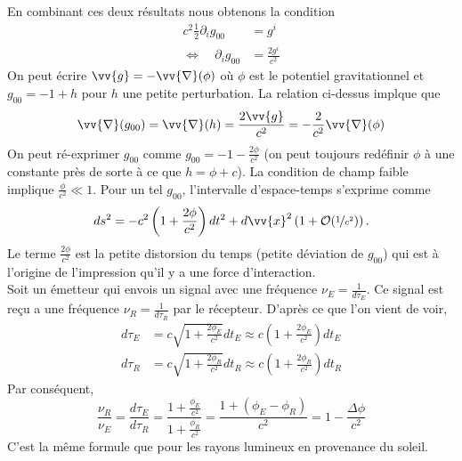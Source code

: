 \documentclass[a4paper,11pt]{report}
\theoremstyle{definition}
\theoremstyle{plain}
\theoremstyle{definition}
\theoremstyle{remark}
\newcommand{\p}{\partial}
\begin{document}
            En combinant ces deux résultats nous obtenons la condition
            \begin{align}
                c^2\frac{1}{2}\p_i g_{00} &= g^i \\
                \Leftrightarrow\quad \p_i g_{00} &= \frac{2g^i}{c^2} 
            \end{align}
            On peut écrire $\vv{g}=-\vv{\nabla}(\phi)$ où $\phi$ est le potentiel gravitationnel et $g_{00}=-1+h$ pour $h$ une petite perturbation. La relation ci-dessus implque que
            \begin{equation}
                \vv{\nabla}(g_{00}) = \vv{\nabla}(h) = \frac{2\vv{g}}{c^2} = -\frac{2}{c^2}\vv{\nabla}(\phi)
            \end{equation}
            On peut ré-exprimer $g_{00}$ comme $g_{00} = -1-\frac{2\phi}{c^2}$ (on peut toujours redéfinir $\phi$ à une constante près de sorte à ce que $h = \phi+c$). La condition de champ faible implique $\frac{\phi}{c^2}\ll 1$. Pour un tel $g_{00}$, l'intervalle d'espace-temps s'exprime comme
            \begin{equation}
                ds^2 = -c^2\left( 1+\frac{2\phi}{c^2} \right)dt^2 + d\vv{x}^2\left( 1+\order{\nicefrac{1}{c^2}} \right).
            \end{equation}
            Le terme $\frac{2\phi}{c^2}$ est la petite distorsion du temps (petite déviation de $g_{00}$) qui est à l'origine de l'impression qu'il y a une force d'interaction.\\
            
            Soit un émetteur qui envois un signal avec une fréquence $\nu_E = \frac{1}{d\tau_E}$. Ce signal est reçu a une fréquence $\nu_R = \frac{1}{d\tau_R}$ par le récepteur. D'après ce que l'on vient de voir,
            \begin{align}
                d\tau_E &= c\sqrt{1+\frac{2\phi_E}{c^2}}dt_E \approx c\left( 1+\frac{2\phi_E}{c^2} \right) dt_E\\
                d\tau_R &= c\sqrt{1+\frac{2\phi_R}{c^2}}dt_R \approx c\left( 1+\frac{2\phi_R}{c^2} \right) dt_R
            \end{align}
            Par conséquent,
            \begin{equation}
                \frac{\nu_R}{\nu_E} = \frac{d\tau_E}{d\tau_R} = \frac{1+\frac{\phi_E}{c^2}}{1+\frac{\phi_R}{c^2}} = \frac{1+ (\phi_E-\phi_R)}{c^2} = 1-\frac{\Delta \phi}{c^2}
            \end{equation}
            C'est la même formule que pour les rayons lumineux en provenance du soleil.
\end{document}
